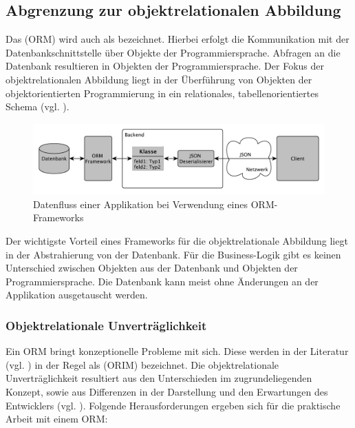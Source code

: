 \subsection{Abgrenzung zur objektrelationalen Abbildung}
Das  (ORM) wird auch als  bezeichnet. Hierbei erfolgt die Kommunikation mit der Datenbankschnittstelle über Objekte der Programmiersprache. Abfragen an die Datenbank resultieren in Objekten der Programmiersprache. Der Fokus der objektrelationalen Abbildung liegt in der Überführung von Objekten der objektorientierten Programmierung in ein relationales, tabellenorientiertes Schema (vgl. \cite{wambler}). 

\begin{figure}[h]   
  \centering     
  \includegraphics[width=1.0\textwidth]{img/dataflow_orm.pdf}  
   \caption{Datenfluss einer Applikation bei Verwendung eines ORM-\gls{Framework}s}   
  \label{fig:orm} 
\end{figure}

Der wichtigste Vorteil eines \gls{Framework}s für die objektrelationale Abbildung liegt in der Abstrahierung von der Datenbank. Für die \gls{Business-Logik} gibt es keinen Unterschied zwischen Objekten aus der Datenbank und Objekten der Programmiersprache. Die Datenbank kann meist ohne Änderungen an der Applikation ausgetauscht werden.

\FloatBarrier
\subsubsection{Objektrelationale Unverträglichkeit}
\label{sec:unvertraeglich}
Ein ORM bringt konzeptionelle Probleme mit sich. Diese werden in der Literatur (vgl. \cite{ireland2009classification}) in der Regel als  (ORIM) bezeichnet. Die objektrelationale Unverträglichkeit resultiert aus den Unterschieden im zugrundeliegenden Konzept, sowie aus Differenzen in der Darstellung und den Erwartungen des Entwicklers (vgl. \cite{bowers}).
\pagebreak %
Folgende Herausforderungen ergeben sich für die praktische Arbeit mit einem ORM:


